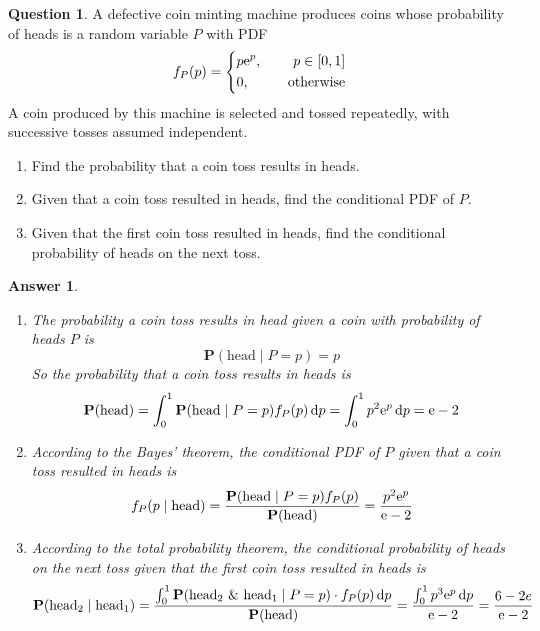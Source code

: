 \documentclass[utf8]{article}
\theoremstyle{definition}%
\newtheorem{question}{Question} %
\theoremstyle{plain}%
\newtheorem{answer}{Answer} %
\begin{document}
\begin{question}
    A defective coin minting machine produces coins whose probability of heads is a random variable $P$ with PDF
    \begin{equation}
        f_{P}(p) = \left\{\begin{aligned}
            &p \mathrm{e}^p, \quad &p \in [0, 1] \\ 
            &0, \quad &\text{otherwise}
        \end{aligned}\right.
    \end{equation}
    A coin produced by this machine is selected and tossed repeatedly, with successive tosses assumed independent.
    \begin{enumerate}[label=(\alph*)]
        \item Find the probability that a coin toss results in heads.
        \item Given that a coin toss resulted in heads, find the conditional PDF of $P$.
        \item Given that the first coin toss resulted in heads, find the conditional probability of heads on the next toss.
    \end{enumerate}
\end{question} 
\begin{answer} ~
    \begin{enumerate}[label=(\alph*)]
        \item The probability a coin toss results in head given a coin with probability of heads $P$ is
        \begin{equation}
            \mathbf{P}(\text{head} \mid P = p) = p
        \end{equation}
        So the probability that a coin toss results in heads is
        \begin{equation}
            \mathbf{P}(\text{head}) = \int_{0}^{1} \mathbf{P}(\text{head} \mid P = p)f_{P}(p) \dd{p} = \int_{0}^{1} p^2 \mathrm{e}^p \dd{p} = \mathrm{e} - 2
        \end{equation}
        \item According to the Bayes' theorem, the conditional PDF of $P$ given that a coin toss resulted in heads is
        \begin{equation}
            f_{P}(p \mid \text{head}) = \frac{\mathbf{P}(\text{head} \mid P = p)f_{P}(p)}{\mathbf{P}(\text{head})} = \frac{p^2 \mathrm{e}^p}{\mathrm{e} - 2}
        \end{equation}
        \item According to the total probability theorem, the conditional probability of heads on the next toss given that the first coin toss resulted in heads is
        \begin{equation}
            \mathbf{P}(\text{head}_2 \mid \text{head}_1) = \frac{\int_0^1 \mathbf{P}(\text{head}_2 ~\&~ \text{head}_1 \mid P = p) \cdot f_{P}(p) \dd{p}}{\mathbf{P}(\text{head})} = \frac{\int_{0}^{1} p^3 \mathrm{e}^p \dd{p}}{\mathrm{e} - 2} = \frac{6 - 2e}{\mathrm{e} - 2}
        \end{equation}
    \end{enumerate}
\end{answer}
\end{document}
